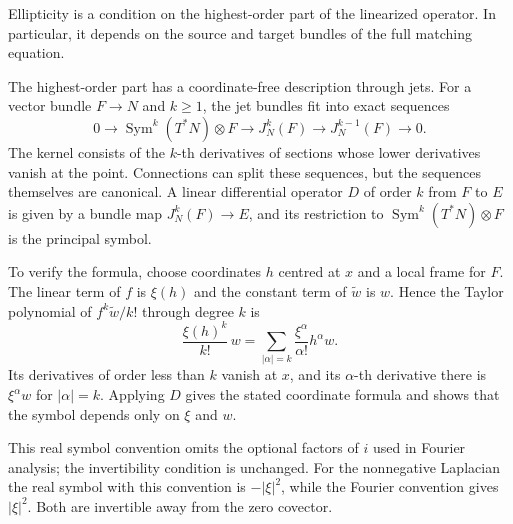 Ellipticity is a condition on the highest-order part of the linearized
operator. In particular, it depends on the source and target bundles
of the full matching equation.

The highest-order part has a coordinate-free description through jets.
For a vector bundle $F\to N$ and $k\geq1$, the jet bundles fit into exact sequences
\[
 0\longrightarrow\operatorname{Sym}^k(T^*N)\otimes F
 \longrightarrow J_N^k(F)\longrightarrow J_N^{k-1}(F)
 \longrightarrow0.
\]
The kernel consists of the $k$-th derivatives of sections whose lower
derivatives vanish at the point. Connections can split these sequences,
but the sequences themselves are canonical. A linear differential
operator $D$ of order $k$ from $F$ to $E$ is given by a bundle map
$J_N^k(F)\to E$, and its restriction to
$\operatorname{Sym}^k(T^*N)\otimes F$ is the principal symbol.


To verify the formula, choose coordinates $h$ centred at $x$ and a
local frame for $F$. The linear term of $f$ is $\xi(h)$ and the
constant term of $\tilde w$ is $w$. Hence the Taylor polynomial of
$f^k\tilde w/k!$ through degree $k$ is
\[
 \frac{\xi(h)^k}{k!}\,w
 =\sum_{|\alpha|=k}\frac{\xi^\alpha}{\alpha!}h^\alpha w.
\]
Its derivatives of order less than $k$ vanish at $x$, and its
$\alpha$-th derivative there is $\xi^\alpha w$ for $|\alpha|=k$.
Applying $D$ gives the stated coordinate formula and shows that the
symbol depends only on $\xi$ and $w$.

This real symbol convention omits the optional factors of $i$ used in
Fourier analysis; the invertibility condition is unchanged.
For the nonnegative Laplacian the real symbol with this convention is
$-|\xi|^2$, while the Fourier convention gives $|\xi|^2$.
Both are invertible away from the zero covector.

